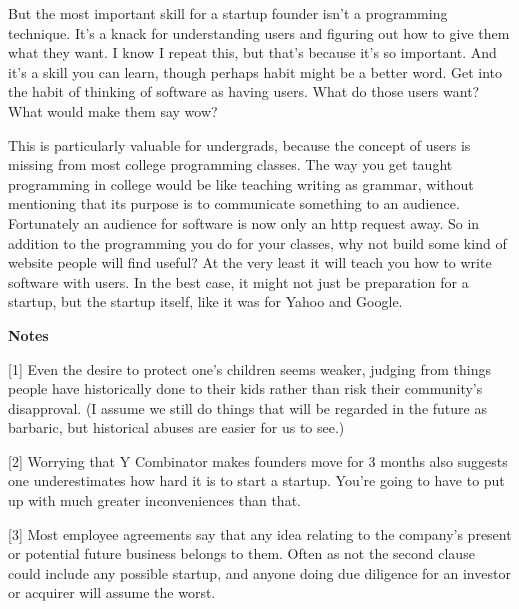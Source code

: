                   But the most important skill for a startup founder isn't a
                  programming technique. It's a knack for understanding users
                  and figuring out how to give them what they want. I know I
                  repeat this, but that's because it's so important. And it's a
                  skill you can learn, though perhaps habit might be a better
                  word. Get into the habit of thinking of software as having
                  users. What do those users want? What would make them say
                  wow?

This is particularly valuable for undergrads,
                  because the concept of users is missing from most college
                  programming classes. The way you get taught programming in
                  college would be like teaching writing as grammar, without
                  mentioning that its purpose is to communicate something to an
                  audience. Fortunately an audience for software is now only an
                  http request away. So in addition to the programming you do
                  for your classes, why not build some kind of website people
                  will find useful? At the very least it will teach you how to
                  write software with users. In the best case, it might not just
                  be preparation for a startup, but the startup itself, like it
                  was for Yahoo and Google.



\textbf{Notes}

[1] Even the desire to protect one's children seems weaker,
                  judging from things people have historically done to their
                  kids rather than risk their community's disapproval. (I assume
                  we still do things that will be regarded in the future as
                  barbaric, but historical abuses are easier for us to see.)

[2] Worrying that Y Combinator makes founders move for 3 months
                  also suggests one underestimates how hard it is to start a
                  startup. You're going to have to put up with much greater
                  inconveniences than that.

[3] Most employee agreements say that any idea relating to the
                  company's present or potential future business belongs to
                  them. Often as not the second clause could include any
                  possible startup, and anyone doing due diligence for an
                  investor or acquirer will assume the worst.

